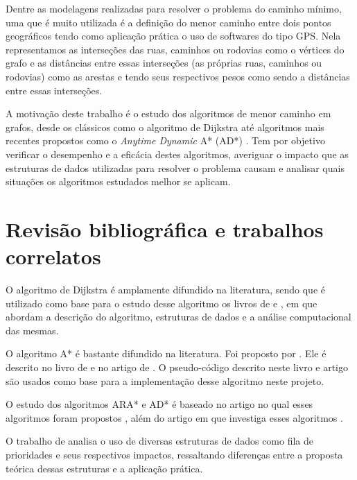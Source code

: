 Dentre as modelagens realizadas para resolver o problema do caminho mínimo, uma que é muito utilizada é a definição do menor caminho entre dois pontos geográficos tendo como aplicação prática o uso de softwares do tipo GPS. Nela representamos as interseções das ruas, caminhos ou rodovias como o vértices do grafo e as distâncias entre essas interseções (as próprias ruas, caminhos ou rodovias) como as arestas e tendo seus respectivos pesos como sendo a distâncias entre essas interseções.


A motivação deste trabalho é o estudo dos algoritmos de menor caminho em grafos, desde os clássicos como o algoritmo de Dijkstra \cite{dijkstra1959note} até algoritmos mais recentes propostos como o \textit{Anytime Dynamic} A* (AD*) \cite{likhachev2008anytime}. Tem por  objetivo verificar o desempenho e a eficácia destes algoritmos, averiguar o impacto que as estruturas de dados utilizadas para resolver o problema causam e analisar quais situações os algoritmos estudados melhor se aplicam.

\section{Revisão bibliográfica e trabalhos correlatos}
\label{sec-intro-correlatos}
O algoritmo de Dijkstra é amplamente difundido na literatura, sendo que é utilizado como base para o estudo desse algoritmo os livros de  e , em que abordam a descrição do algoritmo, estruturas de dados e a análise computacional das mesmas.

O algoritmo A* é bastante difundido na literatura. Foi proposto por . Ele é descrito no livro de  e no artigo de . O pseudo-código descrito neste livro e artigo são usados como base para a implementação desse algoritmo neste projeto.

O estudo dos algoritmos ARA* e AD* é baseado no artigo no qual esses algoritmos foram propostos \cite{likhachev2008anytime}, além do artigo em que investiga esses algoritmos \cite{moura2010estudo}.

O trabalho de  analisa o uso de diversas estruturas de dados como fila de prioridades e seus respectivos impactos, ressaltando diferenças entre a proposta teórica dessas estruturas e a aplicação prática.
